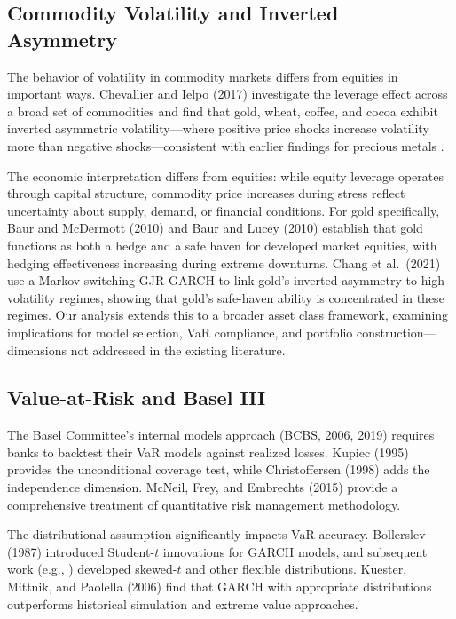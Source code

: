 \subsection{Commodity Volatility and Inverted Asymmetry}

The behavior of volatility in commodity markets differs from equities in important ways. Chevallier and Ielpo (2017) investigate the leverage effect across a broad set of commodities and find that gold, wheat, coffee, and cocoa exhibit inverted asymmetric volatility---where positive price shocks increase volatility more than negative shocks---consistent with earlier findings for precious metals \citep{batten2010}.

The economic interpretation differs from equities: while equity leverage operates through capital structure, commodity price increases during stress reflect uncertainty about supply, demand, or financial conditions. For gold specifically, Baur and McDermott (2010) and Baur and Lucey (2010) establish that gold functions as both a hedge and a safe haven for developed market equities, with hedging effectiveness increasing during extreme downturns. Chang et al.\ (2021) use a Markov-switching GJR-GARCH to link gold's inverted asymmetry to high-volatility regimes, showing that gold's safe-haven ability is concentrated in these regimes. Our analysis extends this to a broader asset class framework, examining implications for model selection, VaR compliance, and portfolio construction---dimensions not addressed in the existing literature.

\subsection{Value-at-Risk and Basel III}

The Basel Committee's internal models approach (BCBS, 2006, 2019) requires banks to backtest their VaR models against realized losses. Kupiec (1995) provides the unconditional coverage test, while Christoffersen (1998) adds the independence dimension. McNeil, Frey, and Embrechts (2015) provide a comprehensive treatment of quantitative risk management methodology.

The distributional assumption significantly impacts VaR accuracy. Bollerslev (1987) introduced Student-$t$ innovations for GARCH models, and subsequent work (e.g., \citealt{hansen1994}) developed skewed-$t$ and other flexible distributions. Kuester, Mittnik, and Paolella (2006) find that GARCH with appropriate distributions outperforms historical simulation and extreme value approaches.

